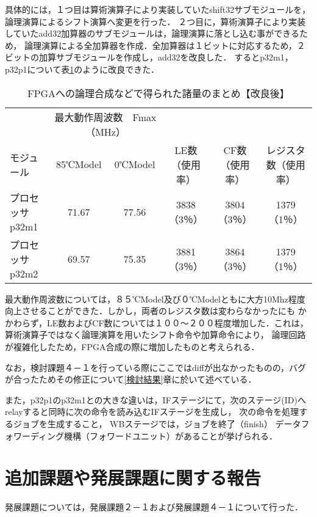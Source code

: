\documentclass{jarticle}[11pt]
\begin{document}
  具体的には，１つ目は算術演算子により実装していたshift32サブモジュールを，論理演算によるシフト演算へ変更を行った．
  ２つ目に，算術演算子により実装していたadd32加算器のサブモジュールは，論理演算に落とし込む事ができるため，
  論理演算による全加算器を作成．全加算器は１ビットに対応するため，２ビットの加算サブモジュールを作成し，add32を改良した．
  するとp32m1，p32p1について表\ref{FPGAへの論理合成などで得られた諸量のまとめ【改良後】}のように改良できた．

  \begin{table}[h]
    \caption{FPGAへの論理合成などで得られた諸量のまとめ【改良後】}
    \label{FPGAへの論理合成などで得られた諸量のまとめ【改良後】}
    \begin{tabular}{l|ccccc}
      \hline \hline
               & \multicolumn{2}{c}{最大動作周波数　Fmax（MHz）} &          &          &            \\
      モジュール      & 85℃Model& 0℃Model& LE数（使用率） & CF数（使用率） & レジスタ数（使用率） \\ \hline
      プロセッサp32m1 & 71.67& 77.56 & 3838（3％）   & 3804（3％）    & 1379（1％）         \\
      プロセッサp32m2 & 69.57 & 75.35 & 3881（3％）   & 3864（3％）    & 1379（1％）           \\
    \end{tabular}
  \end{table}

  最大動作周波数については，８５℃Model及び０℃Modelともに大方10Mhz程度向上させることができた．しかし，両者のレジスタ数は変わらなかったにも
  かかわらず，LE数およびCF数については１００～２００程度増加した．これは，算術演算子ではなく論理演算を用いたシフト命令や加算命令により，
  論理回路が複雑化したため，FPGA合成の際に増加したものと考えられる．

  なお，検討課題４－１を行っている際にここではdiffが出なかったものの，バグが合ったためその修正について\ref{検討結果}章に於いて述べている．


  また，p32p1のp32m1との大きな違いは，IFステージにて，次のステージ(ID)へrelayすると同時に次の命令を読み込むIFステージを生成し，
  次の命令を処理するジョブを生成すること，
  WBステージでは，ジョブを終了（finish）
  データフォワーディング機構（フォワードユニット）があることが挙げられる．

  \section{追加課題や発展課題に関する報告}\label{sec:追加課題や発展課題に関する報告}
  発展課題については，発展課題２－１および発展課題４－１について行った．
\end{document}
